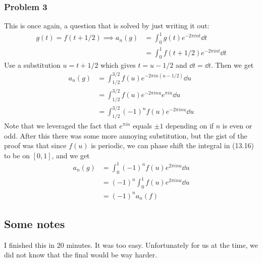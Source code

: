 \subsubsection{Problem 3}
\begin{solution}
    This is once again, a question that is solved by just writing it out:
    \begin{align}
        g(t) = f(t + 1/2) \implies a_n(g) &= \int_0^1 g(t) e^{-2\pi int} \dd{t}\\
        &= \int_0^1 f(t+1/2) e^{-2\pi int} \dd{t}
    \end{align}
    Use a substitution $u = t+1/2$ which gives $t = u-1/2$ and $\dd{t} = \dd{t}$. Then we get
    \begin{align}
        a_n(g) &= \int_{1/2}^{3/2} f(u) e^{-2\pi in(u - 1/2)} \dd{u}\\
        &= \int_{1/2}^{3/2} f(u) e^{-2\pi inu} e^{\pi in} \dd{u}\\
        &= \int_{1/2}^{3/2} (-1)^n f(u) e^{-2\pi inu} \dd{u}
    \end{align}
    Note that we leveraged the fact that $e^{\pi i n}$ equals $\pm 1$ depending on if $n$ is even or odd. After this there was some more annoying substitution, but the gist of the proof was that since $f(u)$ is periodic, we can phase shift the integral in (13.16) to be on $[0,1]$, and we get
    \begin{align}
        a_n(g) &= \int_0^1 (-1)^n  f(u) e^{2\pi in u} \dd{u}\\
        &= (-1)^n \int_0^1 f(u) e^{2\pi in u} \dd{u}\\
        &= (-1)^n a_n(f)
    \end{align}
\end{solution}
\subsection{Some notes}
I finished this in 20 minutes. It was too easy. Unfortunately for us at the time, we did not know that the final would be way harder.